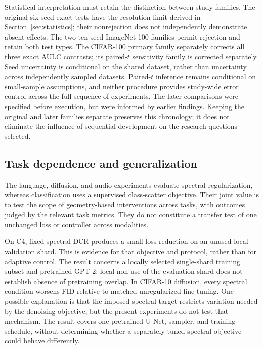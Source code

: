 \documentclass[10pt,a4paper,twocolumn]{article}
\begin{document}
Statistical interpretation must retain the distinction between study
families. The original six-seed exact tests have the resolution limit
derived in Section~\ref{sec:statistics}; their nonrejection does not
independently demonstrate absent effects. The two ten-seed ImageNet-100 families permit
rejection and retain both test types. The CIFAR-100 primary family
separately corrects all three exact AULC contrasts; its paired-$t$
sensitivity family is corrected separately. Seed uncertainty is
conditional on the shared dataset, rather than uncertainty across
independently sampled datasets. Paired-$t$ inference remains
conditional on small-sample assumptions, and neither procedure provides
study-wide error control across the full sequence of experiments.
The later comparisons were specified before execution, but were informed
by earlier findings. Keeping the original and later families separate
preserves this chronology; it does not eliminate the influence of
sequential development on the research questions selected.

\subsection{Task dependence and generalization}
\label{sec:extensions}

The language, diffusion, and audio experiments evaluate spectral
regularization, whereas classification uses a supervised class-scatter
objective. Their joint value is to test the scope of geometry-based
interventions across tasks, with outcomes judged by the relevant task
metrics. They do not constitute a transfer test of one unchanged loss
or controller across modalities.

On C4, fixed spectral DCR produces a small loss reduction on an unused
local validation shard. This is evidence for that objective and
protocol, rather than for adaptive control. The result concerns a
locally selected single-shard training subset and pretrained GPT-2;
local non-use of the evaluation shard does not establish absence of
pretraining overlap. In CIFAR-10 diffusion, every spectral condition
worsens FID relative to matched unregularized fine-tuning. One possible
explanation is that the imposed spectral target restricts variation
needed by the denoising objective, but the present experiments do not
test that mechanism. The result covers one pretrained U-Net, sampler,
and training schedule, without determining whether a separately tuned
spectral objective could behave differently.
\end{document}
